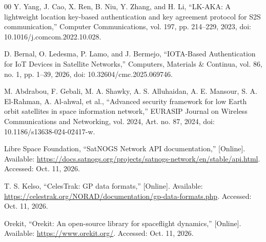 \documentclass[conference]{IEEEtran}
\begin{document}
\begin{thebibliography}{00}
Y. Yang, J. Cao, X. Ren, B. Niu, Y. Zhang, and H. Li, ``LK-AKA: A lightweight location key-based authentication and key agreement protocol for S2S communication,'' Computer Communications, vol. 197, pp. 214--229, 2023, doi: 10.1016/j.comcom.2022.10.028.

D. Bernal, O. Ledesma, P. Lamo, and J. Bermejo, ``IOTA-Based Authentication for IoT Devices in Satellite Networks,'' Computers, Materials \& Continua, vol. 86, no. 1, pp. 1--39, 2026, doi: 10.32604/cmc.2025.069746.

M. Abdrabou, F. Gebali, M. A. Shawky, A. S. Alluhaidan, A. E. Mansour, S. A. El-Rahman, A. Al-ahwal, et al., ``Advanced security framework for low Earth orbit satellites in space information network,'' EURASIP Journal on Wireless Communications and Networking, vol. 2024, Art. no. 87, 2024, doi: 10.1186/s13638-024-02417-w.


Libre Space Foundation, ``SatNOGS Network API documentation,'' [Online]. Available: \url{https://docs.satnogs.org/projects/satnogs-network/en/stable/api.html}. Accessed: Oct. 11, 2026.

T. S. Kelso, ``CelesTrak: GP data formats,'' [Online]. Available: \url{https://celestrak.org/NORAD/documentation/gp-data-formats.php}. Accessed: Oct. 11, 2026.

Orekit, ``Orekit: An open-source library for spaceflight dynamics,'' [Online]. Available: \url{https://www.orekit.org/}. Accessed: Oct. 11, 2026.

\end{thebibliography}
\end{document}
